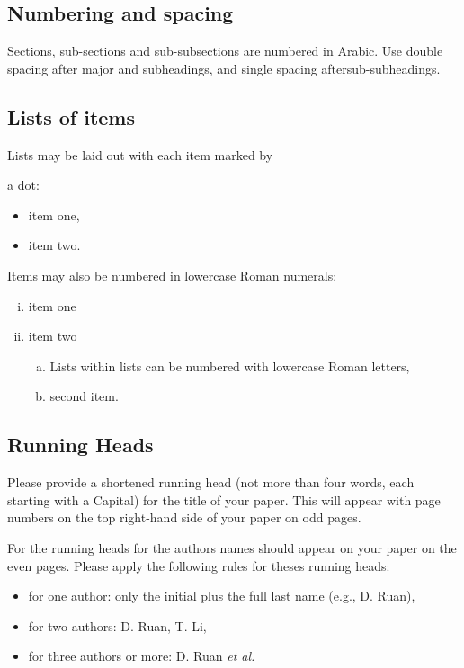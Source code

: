 \documentclass[11pt,twoside]{article}
\begin{document}
\begin{multicols}{2}
\subsection{Numbering and spacing}

Sections, sub-sections and sub-subsections are numbered in Arabic.
Use double spacing after major and subheadings, and single spacing
after\break sub-subheadings.

\subsection{Lists of items}

{Lists may be laid out with each item marked by\hfilneg}

\noindent a dot:
\begin{itemize}
\item item one,
\item item two.
\end{itemize}

\setcounter{footnote}{0}
\renewcommand{\thefootnote}{\alph{footnote}}

Items may also be numbered in lowercase Roman numerals:
\begin{enumerate}[(i)]\Nospacing
\item item one
\item item two
    \begin{enumerate}[(a)]\Nospacing
    \item Lists within lists can be numbered with lowercase Roman letters,
    \item second item.
    \end{enumerate}
\end{enumerate}

\subsection{Running Heads}

Please provide a shortened running head (not more than four words,
each starting with a Capital) for the title of your paper. This will
appear with page numbers on the top right-hand side of your paper on
odd pages.

For the running heads for the authors names should appear on your paper
on the even  pages. Please apply the following rules for theses running
heads:
\begin{itemize}
\item for one author: only the initial plus the full last name (e.g., D. Ruan),
\item for two authors: D. Ruan, T. Li,
\item for three authors or more: D. Ruan \emph{et al.}
\end{itemize}


\end{multicols}
\end{document}
